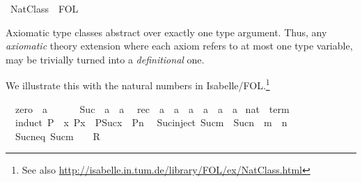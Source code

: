 %
\begin{isabellebody}%
\def\isabellecontext{NatClass}%
%
\isamarkuptrue%
%
\isadelimtheory
%
\endisadelimtheory
%
\isatagtheory
{}\isamarkupfalse%
\ NatClass\ \ FOL\ %
\endisatagtheory
{\isafoldtheory}%
%
\isadelimtheory
%
\endisadelimtheory
%
\begin{isamarkuptext}%
\medskip\noindent Axiomatic type classes abstract over exactly one
 type argument. Thus, any \emph{axiomatic} theory extension where each
 axiom refers to at most one type variable, may be trivially turned
 into a \emph{definitional} one.

 We illustrate this with the natural numbers in
 Isabelle/FOL.\footnote{See also
 \url{http://isabelle.in.tum.de/library/FOL/ex/NatClass.html}}%
\end{isamarkuptext}%
\isamarkuptrue%
\isamarkupfalse%
\isanewline
\ \ zero\ {\isacharcolon}{\isacharcolon}\ {\isacharprime}a\ \ \ \ {\isacharparenleft}{\isachardoublequoteopen}{\isasymzero}{\isachardoublequoteclose}{\isacharparenright}\isanewline
\ \ Suc\ {\isacharcolon}{\isacharcolon}\ {\isachardoublequoteopen}{\isacharprime}a\ {\isasymRightarrow}\ {\isacharprime}a{\isachardoublequoteclose}\isanewline
\ \ rec\ {\isacharcolon}{\isacharcolon}\ {\isachardoublequoteopen}{\isacharprime}a\ {\isasymRightarrow}\ {\isacharprime}a\ {\isasymRightarrow}\ {\isacharparenleft}{\isacharprime}a\ {\isasymRightarrow}\ {\isacharprime}a\ {\isasymRightarrow}\ {\isacharprime}a{\isacharparenright}\ {\isasymRightarrow}\ {\isacharprime}a{\isachardoublequoteclose}\isanewline
\isanewline
{}\isamarkupfalse%
\ nat\ {\isasymsubseteq}\ {\isachardoublequoteopen}term{\isachardoublequoteclose}\isanewline
\ \ induct{\isacharcolon}\ {\isachardoublequoteopen}P{\isacharparenleft}{\isasymzero}{\isacharparenright}\ {\isasymLongrightarrow}\ {\isacharparenleft}{\isasymAnd}x{\isachardot}\ P{\isacharparenleft}x{\isacharparenright}\ {\isasymLongrightarrow}\ P{\isacharparenleft}Suc{\isacharparenleft}x{\isacharparenright}{\isacharparenright}{\isacharparenright}\ {\isasymLongrightarrow}\ P{\isacharparenleft}n{\isacharparenright}{\isachardoublequoteclose}\isanewline
\ \ Suc{\isacharunderscore}inject{\isacharcolon}\ {\isachardoublequoteopen}Suc{\isacharparenleft}m{\isacharparenright}\ {\isacharequal}\ Suc{\isacharparenleft}n{\isacharparenright}\ {\isasymLongrightarrow}\ m\ {\isacharequal}\ n{\isachardoublequoteclose}\isanewline
\ \ Suc{\isacharunderscore}neq{\isacharunderscore}{}{\isacharcolon}\ {\isachardoublequoteopen}Suc{\isacharparenleft}m{\isacharparenright}\ {\isacharequal}\ {\isasymzero}\ {\isasymLongrightarrow}\ R{\isachardoublequoteclose}\isanewline

\end{isabellebody}
